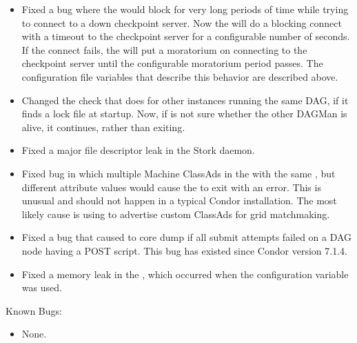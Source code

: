 \begin{itemize}

\item Fixed a bug where the  would block for very long
periods of time while trying to connect to a down checkpoint server. Now
the  will do a blocking connect with a timeout to the
checkpoint server for a configurable number of seconds. If the connect
fails, the  will put a moratorium on connecting to the
checkpoint server until the configurable moratorium period passes. The
configuration file variables that describe this behavior are described
above.

\item Changed the check that  does for other 
 instances
running the same DAG, if it finds a lock file at startup.
Now, if  is not sure whether the other DAGMan is alive,
it continues, rather than exiting.

\item Fixed a major file descriptor leak in the Stork daemon.

\item Fixed bug in which multiple Machine ClassAds in the
 with the same ,
but different  attribute values
would cause the  to exit with an error.
This is unusual and should not happen in a typical Condor installation.
The most likely cause is using 
to advertise custom ClassAds for grid matchmaking. 

\item Fixed a bug that caused  to core dump if all
submit attempts failed on a DAG node having a POST script.  
This bug has existed since Condor version 7.1.4.

\item Fixed a memory leak in the , which occurred when
the configuration variable  was used.

\end{itemize}

\noindent Known Bugs:

\begin{itemize}

\item None.

\end{itemize}

